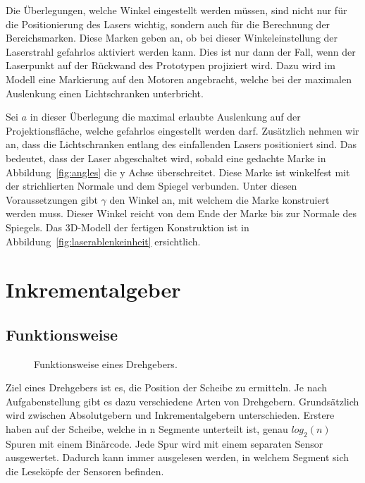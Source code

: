 Die Überlegungen, welche Winkel eingestellt werden müssen, sind nicht nur für die Positionierung des Lasers wichtig, sondern auch für die Berechnung der Bereichsmarken.
Diese Marken geben an, ob bei dieser Winkeleinstellung der Laserstrahl gefahrlos aktiviert werden kann.
Dies ist nur dann der Fall, wenn der Laserpunkt auf der Rückwand des Prototypen projiziert wird.
Dazu wird im Modell eine Markierung auf den Motoren angebracht, welche bei der maximalen Auslenkung einen Lichtschranken unterbricht.

Sei $a$ in dieser Überlegung die maximal erlaubte Auslenkung auf der Projektionsfläche, welche gefahrlos eingestellt werden darf.
Zusätzlich nehmen wir an, dass die Lichtschranken entlang des einfallenden Lasers positioniert sind.
Das bedeutet, dass der Laser abgeschaltet wird, sobald eine gedachte Marke in Abbildung~\ref{fig:angles} die y Achse überschreitet.
Diese Marke ist winkelfest mit der strichlierten Normale und dem Spiegel verbunden.
Unter diesen Voraussetzungen gibt $\gamma$ den Winkel an, mit welchem die Marke konstruiert werden muss.
Dieser Winkel reicht von dem Ende der Marke bis zur Normale des Spiegels.
Das 3D-Modell der fertigen Konstruktion ist in Abbildung~\ref{fig:laserablenkeinheit} ersichtlich.



\section{Inkrementalgeber}

\subsection{Funktionsweise}

\begin{figure}[!h] \centering
	\begin{minipage}[t]{.49\linewidth} \centering
		
	\end{minipage}
	\begin{minipage}[t]{.49\linewidth} \centering
		
	\end{minipage}
	\caption{Funktionsweise eines Drehgebers.}
	\label{fig:drehgeber}
\end{figure}

Ziel eines Drehgebers ist es, die Position der Scheibe zu ermitteln.
Je nach Aufgabenstellung gibt es dazu verschiedene Arten von Drehgebern.
Grundsätzlich wird zwischen Absolutgebern und Inkrementalgebern unterschieden.
Erstere haben auf der Scheibe, welche in n Segmente unterteilt ist, genau $log_2(n)$ Spuren mit einem Binärcode.
Jede Spur wird mit einem separaten Sensor ausgewertet.
Dadurch kann immer ausgelesen werden, in welchem Segment sich die Leseköpfe der Sensoren befinden.

